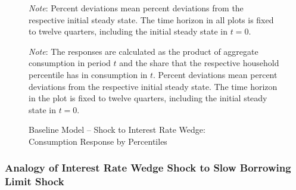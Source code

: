 \documentclass[a4paper,12pt]{article} %
\numberwithin{equation}{section} %
\numberwithin{figure}{section}
\numberwithin{table}{section}
\begin{document}
\begin{refsection}
\begin{appendices}
\begin{figure}[H]
     \vspace{10pt}

     \begin{flushleft}
     \footnotesize
	\textit{Note}: Percent deviations mean percent deviations from the respective initial steady state. The time horizon in all plots is fixed to twelve quarters, including the initial steady state in $t=0$.
	\end{flushleft}
\end{figure}

\begin{figure}[H]
    \centering
    \caption{Baseline Model -- Shock to Interest Rate Wedge: \\ Consumption Response by Percentiles}
    \label{fig:baseline-permanent-wedge-dist-c-response}
    
    
    \vspace{10pt}
    
    \begin{minipage}{0.75\textwidth} 
    \footnotesize
    \textit{Note}: The responses are calculated as the product of aggregate consumption in period $t$ and the share that the respective household percentile has in consumption in $t$. Percent deviations mean percent deviations from the respective initial steady state. The time horizon in the plot is fixed to twelve quarters, including the initial steady state in $t=0$.
    \end{minipage}
\end{figure}

\subsubsection{Analogy of Interest Rate Wedge Shock to Slow Borrowing Limit Shock}
\label{sec-app:figures-wedge-analogy}


\end{appendices}
\end{refsection}
\end{document}
